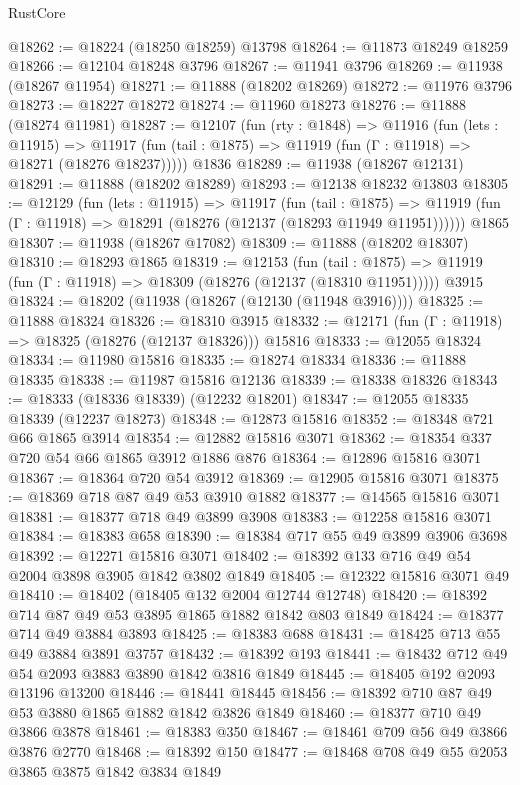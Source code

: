 \begin{lexlean}{RustCore}
\begin{coremodule}
@18262 := @18224 (@18250 @18259) @13798
@18264 := @11873 @18249 @18259
@18266 := @12104 @18248 @3796
@18267 := @11941 @3796
@18269 := @11938 (@18267 @11954)
@18271 := @11888 (@18202 @18269)
@18272 := @11976 @3796
@18273 := @18227 @18272
@18274 := @11960 @18273
@18276 := @11888 (@18274 @11981)
@18287 := @12107
    (fun (rty : @1848) =>
    @11916
      (fun (lets : @11915) =>
      @11917 (fun (tail : @1875) => @11919 (fun (Γ : @11918) => @18271 (@18276 @18237)))))
    @1836
@18289 := @11938 (@18267 @12131)
@18291 := @11888 (@18202 @18289)
@18293 := @12138 @18232 @13803
@18305 := @12129
    (fun (lets : @11915) =>
    @11917
      (fun (tail : @1875) =>
      @11919 (fun (Γ : @11918) => @18291 (@18276 (@12137 (@18293 @11949 @11951))))))
    @1865
@18307 := @11938 (@18267 @17082)
@18309 := @11888 (@18202 @18307)
@18310 := @18293 @1865
@18319 := @12153
    (fun (tail : @1875) => @11919 (fun (Γ : @11918) => @18309 (@18276 (@12137 (@18310 @11951)))))
    @3915
@18324 := @18202 (@11938 (@18267 (@12130 (@11948 @3916))))
@18325 := @11888 @18324
@18326 := @18310 @3915
@18332 := @12171 (fun (Γ : @11918) => @18325 (@18276 (@12137 @18326))) @15816
@18333 := @12055 @18324
@18334 := @11980 @15816
@18335 := @18274 @18334
@18336 := @11888 @18335
@18338 := @11987 @15816 @12136
@18339 := @18338 @18326
@18343 := @18333 (@18336 @18339) (@12232 @18201)
@18347 := @12055 @18335 @18339 (@12237 @18273)
@18348 := @12873 @15816
@18352 := @18348 @721 @66 @1865 @3914
@18354 := @12882 @15816 @3071
@18362 := @18354 @337 @720 @54 @66 @1865 @3912 @1886 @876
@18364 := @12896 @15816 @3071
@18367 := @18364 @720 @54 @3912
@18369 := @12905 @15816 @3071
@18375 := @18369 @718 @87 @49 @53 @3910 @1882
@18377 := @14565 @15816 @3071
@18381 := @18377 @718 @49 @3899 @3908
@18383 := @12258 @15816 @3071
@18384 := @18383 @658
@18390 := @18384 @717 @55 @49 @3899 @3906 @3698
@18392 := @12271 @15816 @3071
@18402 := @18392 @133 @716 @49 @54 @2004 @3898 @3905 @1842 @3802 @1849
@18405 := @12322 @15816 @3071 @49
@18410 := @18402 (@18405 @132 @2004 @12744 @12748)
@18420 := @18392 @714 @87 @49 @53 @3895 @1865 @1882 @1842 @803 @1849
@18424 := @18377 @714 @49 @3884 @3893
@18425 := @18383 @688
@18431 := @18425 @713 @55 @49 @3884 @3891 @3757
@18432 := @18392 @193
@18441 := @18432 @712 @49 @54 @2093 @3883 @3890 @1842 @3816 @1849
@18445 := @18405 @192 @2093 @13196 @13200
@18446 := @18441 @18445
@18456 := @18392 @710 @87 @49 @53 @3880 @1865 @1882 @1842 @3826 @1849
@18460 := @18377 @710 @49 @3866 @3878
@18461 := @18383 @350
@18467 := @18461 @709 @56 @49 @3866 @3876 @2770
@18468 := @18392 @150
@18477 := @18468 @708 @49 @55 @2053 @3865 @3875 @1842 @3834 @1849

\end{coremodule}
\end{lexlean}
